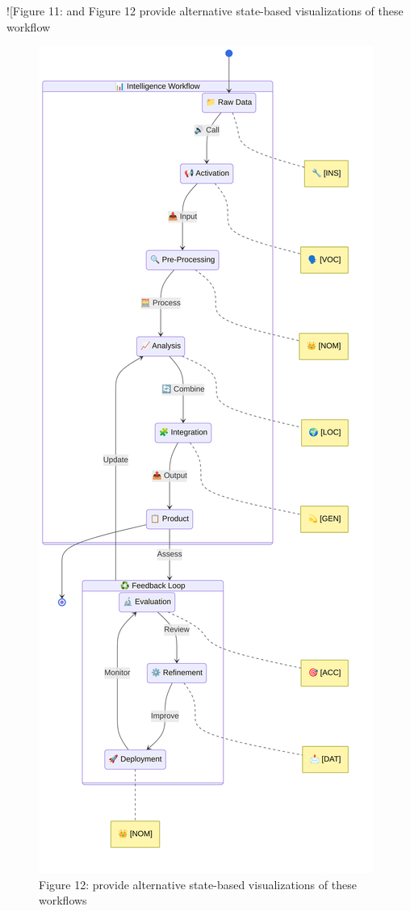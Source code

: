 \documentclass[
  11pt,
  letterpaper,
]{article}
\begin{document}
!{[}Figure 11: and Figure 12 provide alternative state-based
visualizations of these workflow

\begin{figure}
\centering
\includegraphics{figures/Figure_12.png}
\caption{Figure 12: provide alternative state-based visualizations of
these workflows}
\end{figure}
\end{document}
